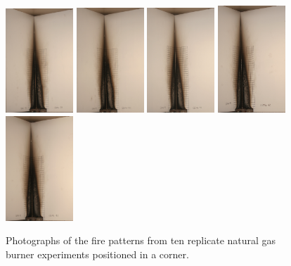 \documentclass[twoside]{uocthesis}
\begin{document}
\begin{figure}[p]
	\includegraphics[width=1.0in]{../Figures/GBNG39_IMG_9222}
	\includegraphics[width=1.0in]{../Figures/GBNG40_IMG_9235}
	\includegraphics[width=1.0in]{../Figures/GBNG41_IMG_9249}
	\includegraphics[width=1.0in]{../Figures/GBNG42_IMG_9262}
	\includegraphics[width=1.0in]{../Figures/GBNG43_IMG_9275} \\

	\caption[Photographs of the fire patterns from ten replicate natural gas burner experiments positioned in a corner]{Photographs of the fire patterns from ten replicate natural gas burner experiments positioned in a corner.}
	\label{NG_Corner}
\end{figure}
\end{document}
